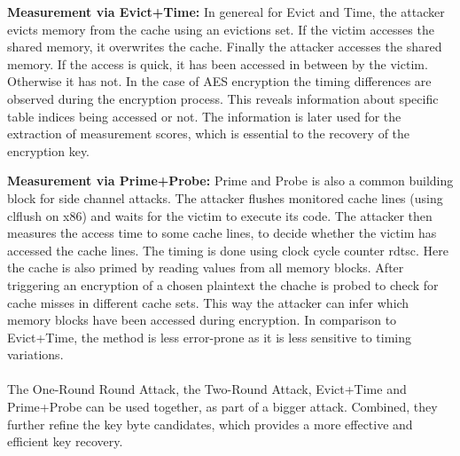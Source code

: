 \textbf{Measurement via Evict+Time:}
In genereal for Evict and Time, the attacker evicts memory from the cache using an evictions set. If the victim accesses the shared memory, it overwrites the cache. Finally the attacker accesses the shared memory. If the access is quick, it has been accessed in between by the victim. Otherwise it has not. In the case of AES encryption the timing differences are observed during the encryption process. This reveals information about specific table indices being accessed or not. The information is later used for the extraction of measurement scores, which is essential to the recovery of the encryption key.

\textbf{Measurement via Prime+Probe:}
Prime and Probe is also a common building block for side channel attacks. The attacker flushes monitored cache lines (using clflush on x86) and waits for the victim to execute its code. The attacker then measures the access time to some cache lines, to decide whether the victim has accessed the cache lines. The timing is done using clock cycle counter rdtsc. Here the cache is also primed by reading values from all memory blocks. After triggering an encryption of a chosen plaintext the chache is probed to check for cache misses in different cache sets. This way the attacker can infer which memory blocks have been accessed during encryption. In comparison to Evict+Time, the method is less error-prone as it is less sensitive to timing variations.


\paragraph{}
The One-Round Round Attack, the Two-Round Attack, Evict+Time and Prime+Probe can be used together, as part of a bigger attack. Combined, they further refine the key byte candidates, which provides a more effective and efficient key recovery. 
